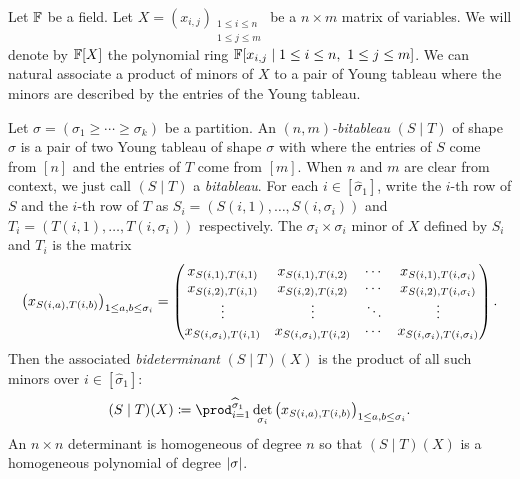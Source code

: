 \documentclass[letterpaper, 11pt]{amsart}
\begin{document}
Let $\mathbb{F}$ be a field.
Let $X = (x_{i, j})_{\substack{1 \leq i \leq n \\ 1 \leq j \leq m}}$ be a $n \times m$ matrix of variables.
We will denote by $\mathbb{F}[X]$ the polynomial ring $\mathbb{F}[x_{i, j} \mid 1 \leq i \leq n,\ 1 \leq j \leq m]$.
We can natural associate a product of minors of $X$ to a pair of Young tableau where the minors are described by the entries of the Young tableau.
\begin{defn}\label{defn:bitableau}
  Let $\sigma = (\sigma_1 \geq \cdots \geq \sigma_k)$ be a partition.
  An \emph{$(n, m)$-bitableau} $(S \mid T)$ of shape $\sigma$ is a pair of two Young tableau of shape $\sigma$ with where the entries of $S$ come from $[n]$ and the entries of $T$ come from $[m]$.
  When $n$ and $m$ are clear from context, we just call $(S \mid T)$ a \emph{bitableau}.
  For each $i\in [\widehat{\sigma}_1]$, write the $i$-th row of $S$ and the $i$-th row of $T$ as $S_i = (S(i, 1), \ldots, S(i, \sigma_i))$ and $T_i = (T(i, 1), \ldots,  T(i, \sigma_i))$ respectively.
  The $\sigma_i \times \sigma_i$ minor of $X$ defined by $S_i$ and $T_i$ is the matrix
  \[
    \pqty{x_{S(i, a), T(i, b)}}_{1 \leq a, b \leq \sigma_i} =
    \begin{pmatrix}
      x_{S(i, 1), T(i, 1)}        & x_{S(i, 1), T(i, 2)}        & \cdots & x_{S(i, 1), T(i, \sigma_i)} \\
      x_{S(i, 2), T(i, 1)}        & x_{S(i, 2), T(i, 2)}        & \cdots & x_{S(i, 2), T(i, \sigma_i)} \\
      \vdots                      & \vdots                      & \ddots & \vdots \\
      x_{S(i, \sigma_i), T(i, 1)} & x_{S(i, \sigma_i), T(i, 2)} & \cdots & x_{S(i, \sigma_i), T(i, \sigma_i)}
    \end{pmatrix}.
  \]
  Then the associated \emph{bideterminant} $(S \mid T)(X)$ is the product of all such minors over $i\in [\widehat{\sigma}_1]$:
  \[
    (S \mid T)(X) \defeq \prod_{i = 1}^{\widehat{\sigma}_1} \det_{\sigma_i}\pqty{x_{S(i, a), T(i, b)}}_{1 \leq a, b \leq \sigma_i}.
  \]
  An $n \times n$ determinant is homogeneous of degree $n$ so that $(S \mid T)(X)$ is a homogeneous polynomial of degree $\abs{\sigma}$.
\end{defn}
\end{document}
